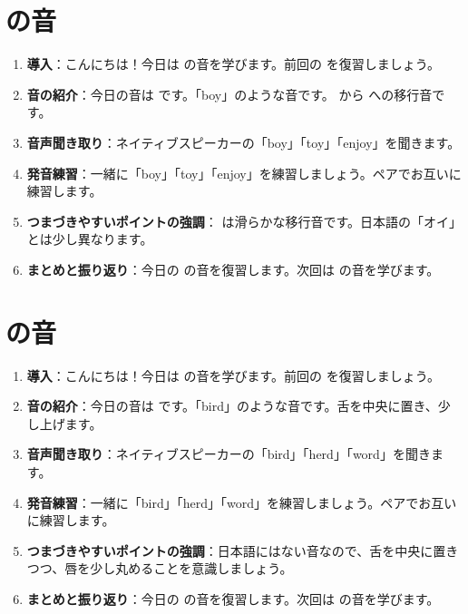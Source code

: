\documentclass[book,jafontscale=0.9247]{jlreq}
\begin{document}
\section{ の音}
\begin{enumerate}
    \item \textbf{導入}：こんにちは！今日は  の音を学びます。前回の  を復習しましょう。
    \item \textbf{音の紹介}：今日の音は  です。「boy」のような音です。  から  への移行音です。
    \item \textbf{音声聞き取り}：ネイティブスピーカーの「boy」「toy」「enjoy」を聞きます。
    \item \textbf{発音練習}：一緒に「boy」「toy」「enjoy」を練習しましょう。ペアでお互いに練習します。
    \item \textbf{つまづきやすいポイントの強調}：  は滑らかな移行音です。日本語の「オイ」とは少し異なります。
    \item \textbf{まとめと振り返り}：今日の  の音を復習します。次回は  の音を学びます。
\end{enumerate}

\section{ の音}
\begin{enumerate}
    \item \textbf{導入}：こんにちは！今日は  の音を学びます。前回の  を復習しましょう。
    \item \textbf{音の紹介}：今日の音は  です。「bird」のような音です。舌を中央に置き、少し上げます。
    \item \textbf{音声聞き取り}：ネイティブスピーカーの「bird」「herd」「word」を聞きます。
    \item \textbf{発音練習}：一緒に「bird」「herd」「word」を練習しましょう。ペアでお互いに練習します。
    \item \textbf{つまづきやすいポイントの強調}：日本語にはない音なので、舌を中央に置きつつ、唇を少し丸めることを意識しましょう。
    \item \textbf{まとめと振り返り}：今日の  の音を復習します。次回は  の音を学びます。
\end{enumerate}
\end{document}
